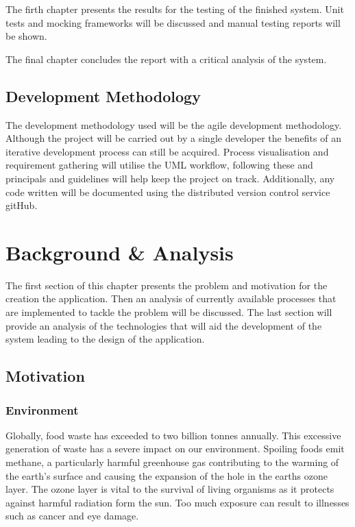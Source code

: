 \documentclass[a4paper, 11pt]{article}
\begin{document}
The firth chapter presents the results for the testing of the finished system. Unit tests and mocking frameworks will be discussed and manual testing reports will be shown.

The final chapter concludes the report with a critical analysis of the system. 

\subsection{Development Methodology}
The development methodology used will be the agile development methodology\cite{agile}. Although the project will be carried out by a single developer the benefits of an iterative development process can still be acquired. Process visualisation and requirement gathering will utilise the UML workflow, following these and principals and guidelines will help keep the project on track. Additionally, any code written will be documented using the distributed version control service gitHub. 
\clearpage

\section{Background \& Analysis}
The first section of this chapter presents the problem and motivation for the creation the application. Then an analysis of currently available processes that are implemented to tackle the problem will be discussed. The last section will provide an analysis of the technologies that will aid the development of the system leading to the design of the application. 

\subsection{Motivation}
\subsubsection{Environment}
Globally, food waste has exceeded to two billion tonnes annually.\cite{waste} This excessive generation of waste has a severe impact on our environment. Spoiling foods emit methane, a particularly harmful greenhouse gas contributing to the warming of the earth's surface and causing the expansion of the hole in the earths ozone layer. The ozone layer is vital to the survival of living organisms as it protects against harmful radiation form the sun. Too much exposure can result to illnesses such as cancer and eye damage. 
\end{document}
